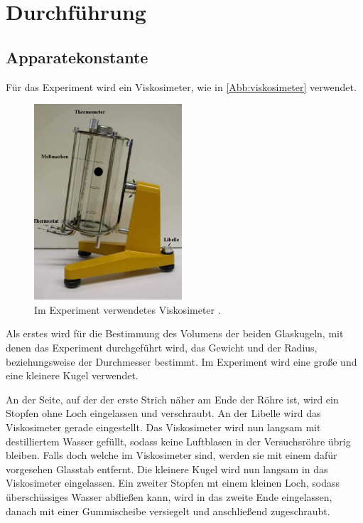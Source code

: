 \section{Durchführung}
\label{sec:Durchführung}

\subsection{Apparatekonstante}
\label{subsec:app}
Für das Experiment wird ein Viskosimeter, wie in \autoref{Abb:viskosimeter} verwendet.



\begin{figure}
    \centering
    \includegraphics[width=5.5cm]{Dateien/Viskosimeter.png}
    \caption{Im Experiment verwendetes Viskosimeter \cite{anleitung107}.}
    \label{Abb:viskosimeter}
\end{figure}

Als erstes wird für die Bestimmung des Volumens der beiden Glaskugeln, mit denen das Experiment durchgeführt wird,
das Gewicht und der Radius, beziehungsweise der Durchmesser bestimmt. Im Experiment wird eine große und eine kleinere Kugel verwendet.

An der Seite, auf der der erste Strich näher am Ende der Röhre ist, wird ein Stopfen ohne Loch eingelassen und verschraubt.
An der Libelle wird das Viskosimeter gerade eingestellt.
Das Viskosimeter wird nun langsam mit destilliertem Wasser gefüllt, sodass keine Luftblasen in der Versuchsröhre %
übrig bleiben. Falls doch welche im Viskosimeter sind, werden sie mit einem dafür vorgesehen Glasstab entfernt. Die kleinere Kugel
wird nun langsam in das Viskosimeter eingelassen.
Ein zweiter Stopfen mt einem kleinen Loch, sodass überschüssiges Wasser abfließen kann, wird in das zweite Ende eingelassen, danach mit einer
Gummischeibe versiegelt und anschließend zugeschraubt.

